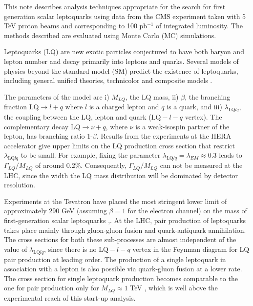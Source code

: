 \documentclass{cmspaper}
\begin{document}
\begin{linenumbers}
This note describes analysis techniques 
appropriate for the
search for first generation scalar leptoquarks 
using data from the CMS experiment taken with 5 TeV proton beams and 
corresponding to 100 pb$^{-1}$ of integrated luminosity.
The methods described are evaluated using 
Monte Carlo (MC) simulations.

Leptoquarks (LQ) are new exotic particles conjectured to have 
both baryon and lepton number and decay primarily into leptons and quarks.    
Several models of physics beyond the standard model (SM) 
predict the existence of leptoquarks, including general unified theories, 
technicolor and composite models \cite{theories}.  

The parameters of the model are i) $M_{LQ}$, the LQ mass, ii) $\beta$, 
the branching fraction 
$\mbox{LQ} \rightarrow l + q$
where $l$ is a charged lepton and $q$ is a quark, and
iii) $\lambda_{\mbox{LQ}lq}$, the coupling between the LQ, lepton and 
quark ($\mbox{LQ}-l-q$ vertex). 
The complementary decay $\mbox{LQ} \rightarrow \nu + q$, 
where $\nu$ is a weak-isospin partner of the lepton,
has branching ratio 1-$\beta$.
Results from the experiments at the HERA accelerator
give upper limits on the LQ production cross section that restrict  
$\lambda_{\mbox{LQ}lq}$ to be small\cite{hera}. 
For example, fixing the parameter 
$\lambda_{\mbox{LQ}lq} = \lambda_{EM} \approx 0.3$ leads to 
$\Gamma_{LQ}/M_{LQ}$ of around 0.2\%. 
Consequently, $\Gamma_{LQ}/M_{LQ}$ can not be measured at the LHC, 
since 
the width the LQ mass distribution will be 
dominated by detector resolution.  

Experiments at the Tevatron have placed the most stringent lower 
limit of approximately 290 GeV (assuming $\beta=1$ for the electron channel) 
on the mass of first-generation scalar leptoquarks \cite{d02008},\cite{cdf2005}.
At the LHC, pair production of leptoquarks takes place 
mainly through gluon-gluon fusion and 
quark-antiquark annihilation. 
The cross sections for both these sub-processes are almost 
independent of the value of 
$\lambda_{\mbox{LQ}lq}$, since there is 
no $\mbox{LQ}-l-q$ vertex in the Feynman diagram for LQ pair production 
at leading order. 
The production of a single leptoquark in association with a lepton 
is also possible via quark-gluon 
fusion at a lower rate. 
The cross section for single leptoquark production
becomes comparable to the one for pair production only 
for $M_{LQ}\approx 1$ TeV \cite{LQSingleAndPairProd}, 
which is well above the experimental reach of this start-up analysis.  


\end{linenumbers}
\end{document}
